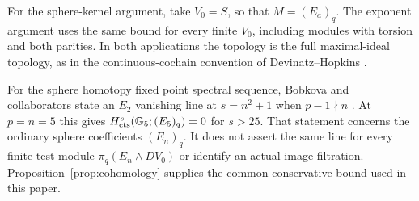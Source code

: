 For the sphere-kernel argument, take $V_0=S$, so that $M=(E_a)_q$.
The exponent argument uses the same bound for every finite $V_0$,
including modules with torsion and both parities. In both applications
the topology is the full maximal-ideal topology, as in the
continuous-cochain convention of Devinatz--Hopkins
\cite[Remark~1.3]{dh2004}.

\begin{remark}\label{rem:sphere-sharp}
For the sphere homotopy fixed point spectral sequence, Bobkova and
collaborators state an $E_2$ vanishing line at $s=n^2+1$ when
$p-1\nmid n$ \cite[Equation~(2) and Remark~1.2]{bobkova2025}.
At $p=n=5$ this gives
$H^s_{\operatorname{cts}}(\mathbb G_5;(E_5)_q)=0$ for $s>25$.
That statement concerns the ordinary sphere coefficients $(E_n)_q$.
It does not assert the same line for every finite-test module
$\pi_q(E_n\wedge DV_0)$ or identify an actual image filtration.
Proposition~\ref{prop:cohomology} supplies the common conservative bound
used in this paper.
\end{remark}

